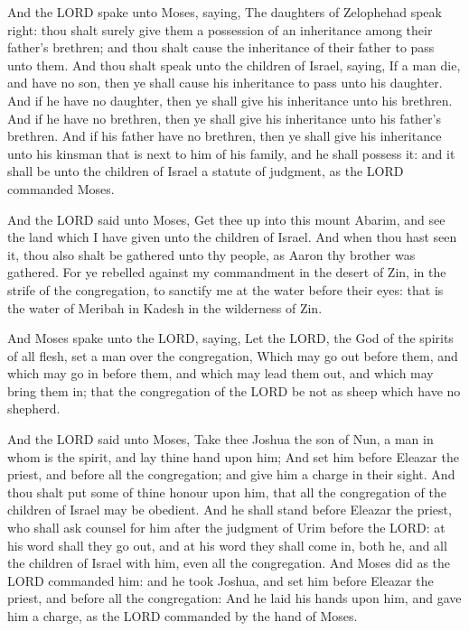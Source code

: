  And the LORD spake unto Moses, saying,  The
daughters of Zelophehad speak right: thou shalt surely give them a
possession of an inheritance among their father's brethren; and thou
shalt cause the inheritance of their father to pass unto them.
 And thou shalt speak unto the children of Israel, saying,
If a man die, and have no son, then ye shall cause his inheritance to
pass unto his daughter.  And if he have no daughter, then ye
shall give his inheritance unto his brethren.  And if he
have no brethren, then ye shall give his inheritance unto his father's
brethren.  And if his father have no brethren, then ye
shall give his inheritance unto his kinsman that is next to him of his
family, and he shall possess it: and it shall be unto the children of
Israel a statute of judgment, as the LORD commanded Moses.

 And the LORD said unto Moses, Get thee up into this mount
Abarim, and see the land which I have given unto the children of Israel.
 And when thou hast seen it, thou also shalt be gathered
unto thy people, as Aaron thy brother was gathered.  For ye
rebelled against my commandment in the desert of Zin, in the strife of
the congregation, to sanctify me at the water before their eyes: that is
the water of Meribah in Kadesh in the wilderness of Zin.

 And Moses spake unto the LORD, saying,  Let
the LORD, the God of the spirits of all flesh, set a man over the
congregation,  Which may go out before them, and which may
go in before them, and which may lead them out, and which may bring them
in; that the congregation of the LORD be not as sheep which have no
shepherd.

 And the LORD said unto Moses, Take thee Joshua the son of
Nun, a man in whom is the spirit, and lay thine hand upon him;
 And set him before Eleazar the priest, and before all the
congregation; and give him a charge in their sight.  And
thou shalt put some of thine honour upon him, that all the congregation
of the children of Israel may be obedient.  And he shall
stand before Eleazar the priest, who shall ask counsel for him after the
judgment of Urim before the LORD: at his word shall they go out, and at
his word they shall come in, both he, and all the children of Israel
with him, even all the congregation.  And Moses did as the
LORD commanded him: and he took Joshua, and set him before Eleazar the
priest, and before all the congregation:  And he laid his
hands upon him, and gave him a charge, as the LORD commanded by the hand
of Moses.

